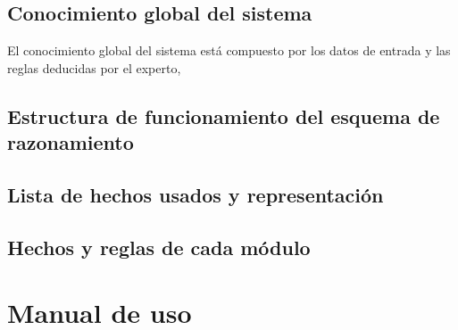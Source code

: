 \documentclass[11pt,leqno]{article}
\theoremstyle{definition_wo_parentheses}
\theoremstyle{plain}
\theoremstyle{remark}
\begin{document}
\subsection{Conocimiento global del sistema}

	El conocimiento global del sistema está compuesto por los datos de entrada y las reglas deducidas por el experto, 
	
\subsection{Estructura de funcionamiento del esquema de razonamiento}
\subsection{Lista de hechos usados y representación}
\subsection{Hechos y reglas de cada módulo}


\section{Manual de uso}
\end{document}
